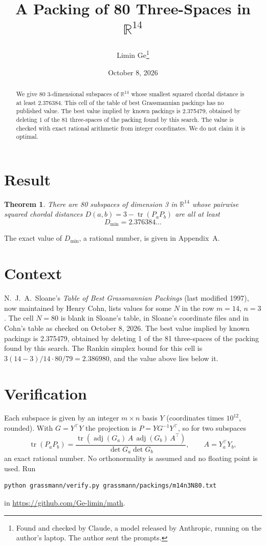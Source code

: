 \documentclass[11pt,a4paper]{article}
\title{A Packing of 80 Three-Spaces in $\mathbb{R}^{14}$}
\author{Limin Ge\thanks{Found and checked by Claude, a model released by Anthropic, running on the author's laptop. The author sent the prompts.}}
\date{October 8, 2026}
\newtheorem*{theorem}{Theorem}
\begin{document}
\maketitle
\begin{abstract}
We give 80 3-dimensional subspaces of $\mathbb{R}^{14}$ whose smallest squared chordal distance is at least 2.376384. This cell of the table of best Grassmannian packings has no published value. The best value implied by known packings is 2.375479, obtained by deleting 1 of the 81 three-spaces of the packing found by this search. The value is checked with exact rational arithmetic from integer coordinates. We do not claim it is optimal.
\end{abstract}

\section{Result}
\begin{theorem}
There are 80 subspaces of dimension 3 in $\mathbb{R}^{14}$ whose pairwise squared chordal distances $D(a,b) = 3 - \operatorname{tr}(P_aP_b)$ are all at least
\[ D_{\min} = 2.376384\ldots \]
\end{theorem}
The exact value of $D_{\min}$, a rational number, is given in Appendix~A.


\section{Context}
N.~J.~A.~Sloane's \emph{Table of Best Grassmannian Packings} (last modified 1997), now maintained by Henry Cohn, lists values for some $N$ in the row $m=14$, $n=3$. The cell $N=80$ is blank in Sloane's table, in Sloane's coordinate files and in Cohn's table as checked on October 8, 2026. The best value implied by known packings is 2.375479, obtained by deleting 1 of the 81 three-spaces of the packing found by this search. The Rankin simplex bound for this cell is $3(14-3)/14\cdot 80/79 = 2.386980$, and the value above lies below it.


\section{Verification}
Each subspace is given by an integer $m\times n$ basis $Y$ (coordinates times $10^{12}$, rounded). With $G=Y^\top Y$ the projection is $P=YG^{-1}Y^\top$, so for two subspaces
\[ \operatorname{tr}(P_aP_b)=\frac{\operatorname{tr}(\operatorname{adj}(G_a)\,A\,\operatorname{adj}(G_b)\,A^\top)}{\det G_a\det G_b},\qquad A=Y_a^\top Y_b, \]
an exact rational number. No orthonormality is assumed and no floating point is used. Run
\begin{verbatim}
python grassmann/verify.py grassmann/packings/m14n3N80.txt
\end{verbatim}
in \url{https://github.com/Ge-limin/math}.
\end{document}
